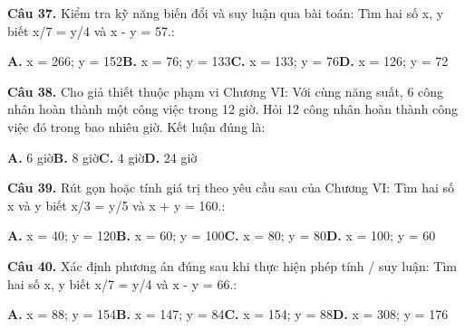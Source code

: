 \documentclass[11pt,a4paper]{article}
\begin{document}
\textbf{\color{primary} Câu 37.} Kiểm tra kỹ năng biến đổi và suy luận qua bài toán: Tìm hai số x, y biết x/7 = y/4 và x - y = 57.:\par
\hspace*{1.5em}\textbf{A.} x = 266; y = 152\quad\quad \textbf{B.} x = 76; y = 133\quad\quad \textbf{C.} x = 133; y = 76\quad\quad \textbf{D.} x = 126; y = 72\par\vspace{2pt}
\textbf{\color{primary} Câu 38.} Cho giả thiết thuộc phạm vi Chương VI: Với cùng năng suất, 6 công nhân hoàn thành một công việc trong 12 giờ. Hỏi 12 công nhân hoàn thành công việc đó trong bao nhiêu giờ. Kết luận đúng là:\par
\hspace*{1.5em}\textbf{A.} 6 giờ\quad\quad \textbf{B.} 8 giờ\quad\quad \textbf{C.} 4 giờ\quad\quad \textbf{D.} 24 giờ\par\vspace{2pt}
\textbf{\color{primary} Câu 39.} Rút gọn hoặc tính giá trị theo yêu cầu sau của Chương VI: Tìm hai số x và y biết x/3 = y/5 và x + y = 160.:\par
\hspace*{1.5em}\textbf{A.} x = 40; y = 120\quad\quad \textbf{B.} x = 60; y = 100\quad\quad \textbf{C.} x = 80; y = 80\quad\quad \textbf{D.} x = 100; y = 60\par\vspace{2pt}
\textbf{\color{primary} Câu 40.} Xác định phương án đúng sau khi thực hiện phép tính / suy luận: Tìm hai số x, y biết x/7 = y/4 và x - y = 66.:\par
\hspace*{1.5em}\textbf{A.} x = 88; y = 154\quad\quad \textbf{B.} x = 147; y = 84\quad\quad \textbf{C.} x = 154; y = 88\quad\quad \textbf{D.} x = 308; y = 176\par\vspace{2pt}
\end{document}
